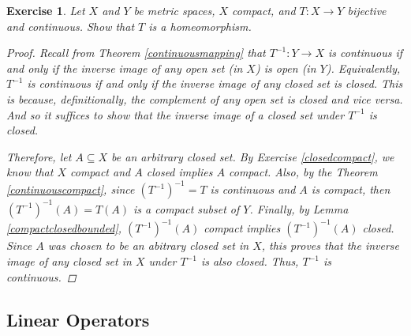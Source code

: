 \documentclass[11pt]{article}
\theoremstyle{mystyle}
\newtheorem{protoexer}{Exercise}[section]
\newenvironment{exer}
{\colorlet{shadecolor}{blue!15}\begin{shaded}\begin{protoexer}}
{\end{protoexer}\end{shaded}}
\newcommand{\0}{\mathbf{0}}
\begin{document}
\begin{exer}
Let $X$ and $Y$ be metric spaces, $X$ compact, and $T: X \longrightarrow Y$ bijective and continuous. Show that $T$ is a homeomorphism.
\begin{proof}
Recall from Theorem \ref{continuousmapping} that $T^{-1}: Y \longrightarrow X$ is continuous if and only if the inverse image of any open set (in $X$) is open (in $Y$). Equivalently, $T^{-1}$ is continuous if and only if the inverse image of any closed set is closed. This is because, definitionally, the complement of any open set is closed and vice versa. And so it suffices to show that the inverse image of a closed set under $T^{-1}$ is closed.

Therefore, let $A \subseteq X$ be an arbitrary closed set. By Exercise \ref{closedcompact}, we know that $X$ compact and $A$ closed implies $A$ compact. Also, by the Theorem \ref{continuouscompact}, since $(T^{-1})^{-1} = T$ is continuous and $A$ is compact, then $(T^{-1})^{-1}(A) = T(A)$ is a compact subset of $Y$. Finally, by Lemma \ref{compactclosedbounded}, $(T^{-1})^{-1}(A)$ compact implies $(T^{-1})^{-1}(A)$ closed. Since $A$ was chosen to be an abitrary closed set in $X$, this proves that the inverse image of any closed set in $X$ under $T^{-1}$ is also closed. Thus, $T^{-1}$ is continuous.
\end{proof}
\end{exer}


\subsection{Linear Operators}
\end{document}
